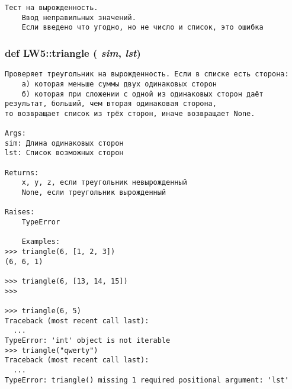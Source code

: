 \footnotesize\begin{verbatim}Тест на вырожденность.
    Ввод неправильных значений.
    Если введено что угодно, но не число и список, это ошибка\end{verbatim}
\normalsize
 \hypertarget{namespace_l_w5_487d20d1da82494dd97dda4048ca32cd}{
\subsubsection[{triangle}]{\setlength{\rightskip}{0pt plus 5cm}def LW5::triangle ( {\em sim}, \/   {\em lst})}}
\label{namespace_l_w5_487d20d1da82494dd97dda4048ca32cd}




\footnotesize\begin{verbatim}
Проверяет треугольник на вырожденность. Если в списке есть сторона:
    а) которая меньше суммы двух одинаковых сторон
    б) которая при сложении с одной из одинаковых сторон даёт результат, больший, чем вторая одинаковая сторона,
то возвращает список из трёх сторон, иначе возвращает None.

Args:
sim: Длина одинаковых сторон
lst: Список возможных сторон

Returns:
    x, y, z, если треугольник невырожденный
    None, если треугольник вырожденный

Raises:
    TypeError

    Examples:
>>> triangle(6, [1, 2, 3])
(6, 6, 1)

>>> triangle(6, [13, 14, 15])
>>>

>>> triangle(6, 5)
Traceback (most recent call last):
  ...
TypeError: 'int' object is not iterable
>>> triangle("qwerty")
Traceback (most recent call last):
  ...
TypeError: triangle() missing 1 required positional argument: 'lst'
\end{verbatim}
\normalsize
 